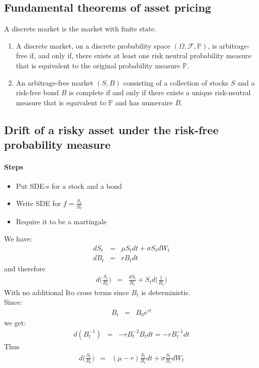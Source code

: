 \subsection{Fundamental theorems of asset pricing}
A discrete market is the market with finite state.
\begin{enumerate}
	\item A discrete market, on a discrete {\color{blue} probability space} $(\Omega, \mathscr{F}, \mathbb{P})$, is arbitrage-free if, and only if, there exists at least one risk neutral probability measure that is equivalent to the original probability measure $\mathbb{P}$.
	\item An arbitrage-free market $(S, B)$ consisting of a collection of stocks $S$ and a risk-free bond $B$ is complete if and only if there exists a unique risk-neutral measure that is equivalent to $\mathbb{P}$ and has numeraire $B$.
\end{enumerate}

\subsection{Drift of a risky asset under the risk-free probability measure}
\paragraph{Steps}
\begin{itemize}
	\item Put SDE-s for a stock and a bond
	\item Write SDE for $f = \frac{S_{t}}{B_{t}}$
	\item Require it to be a martingale
\end{itemize}

We have:
\begin{eqnarray}
dS_{t} &=& \mu S_{t}dt + \sigma S_{t}dW_{t}\\
dB_{t} &=& rB_{t}dt
\end{eqnarray}
and therefore
\begin{eqnarray}
d\bigg(\frac{S_{t}}{B_{t}}\bigg) &=& \frac{dS_{t}}{B_{t}} + S_{t}d\bigg(\frac{1}{B_{t}}\bigg)
\end{eqnarray}
With no additional Ito cross terms since $B_{t}$ is deterministic.\\
Since:
\begin{eqnarray}
B_{t} &=& B_{0}e^{rt}
\end{eqnarray}
we get:
\begin{eqnarray}
d(B_{t}^{-1}) &=& -rB_{t}^{-2}B_{t}dt = -rB_{t}^{-1}dt
\end{eqnarray}
Thus
\begin{eqnarray}
d\bigg(\frac{S_{t}}{B_{t}}\bigg) &=& (\mu - r)\frac{S_{t}}{B_{t}}dt + \sigma\frac{S_{t}}{B_{t}}dW_{t}
\end{eqnarray}